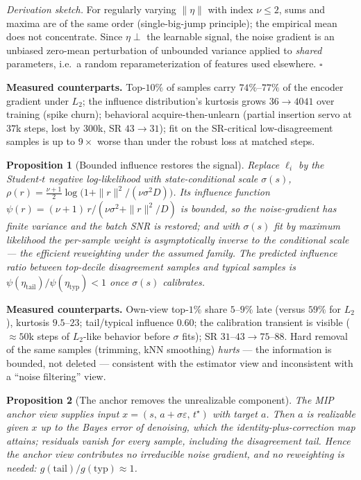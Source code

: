 \documentclass[11pt]{article}
\newtheorem{proposition}{Proposition}
\begin{document}
\emph{Derivation sketch.} For regularly varying $\|\eta\|$ with index
$\nu \le 2$, sums and maxima are of the same order
(single-big-jump principle); the empirical mean does not concentrate. Since
$\eta \perp$ the learnable signal, the noise gradient is an unbiased zero-mean
perturbation of unbounded variance applied to \emph{shared} parameters, i.e.\ a
random reparameterization of features used elsewhere. \hfill$\square$

\noindent\textbf{Measured counterparts.} Top-$10\%$ of samples carry
$74\%$--$77\%$ of the encoder gradient under $L_2$; the influence distribution's
kurtosis grows $36 \to 4041$ over training (spike churn); behavioral
acquire-then-unlearn (partial insertion servo at $37$k steps, lost by $300$k,
SR $43 \to 31$); fit on the SR-critical low-disagreement samples is up to
$9\times$ worse than under the robust loss at matched steps.

\begin{proposition}[Bounded influence restores the signal]\label{prop:robust}
Replace $\ell_i$ by the Student-$t$ negative log-likelihood with
state-conditional scale $\sigma(s)$,
$\rho(r) = \tfrac{\nu+1}{2}\log\!\big(1 + \|r\|^2/(\nu\sigma^2 D)\big)$.
Its influence function
$\psi(r) = (\nu+1)\, r / (\nu\sigma^2 + \|r\|^2/D)$
is bounded, so the noise-gradient has finite variance and the batch SNR is
restored; and with $\sigma(s)$ fit by maximum likelihood the per-sample weight
is asymptotically inverse to the conditional scale --- the efficient reweighting
under the assumed family. The predicted influence ratio between top-decile
disagreement samples and typical samples is
$\psi(\eta_{\mathrm{tail}})/\psi(\eta_{\mathrm{typ}}) < 1$ once
$\sigma(s)$ calibrates.
\end{proposition}

\noindent\textbf{Measured counterparts.} Own-view top-$1\%$ share $5$--$9\%$
late (versus $59\%$ for $L_2$), kurtosis $9.5$--$23$; tail/typical influence
$0.60$; the calibration transient is visible ($\approx 50$k steps of
$L_2$-like behavior before $\sigma$ fits); SR $31$--$43 \to 75$--$88$. Hard
removal of the same samples (trimming, kNN smoothing) \emph{hurts} --- the
information is bounded, not deleted --- consistent with the estimator view and
inconsistent with a ``noise filtering'' view.

\begin{proposition}[The anchor removes the unrealizable component]\label{prop:anchor}
The MIP anchor view supplies input $x = (s,\, a + \sigma\varepsilon,\, t^\star)$
with target $a$. Then $a$ is realizable given $x$ up to the Bayes error of
denoising, which the identity-plus-correction map attains; residuals vanish for
\emph{every} sample, including the disagreement tail. Hence the anchor view
contributes no irreducible noise gradient, and no reweighting is needed:
$g(\mathrm{tail})/g(\mathrm{typ}) \approx 1$.
\end{proposition}
\end{document}
